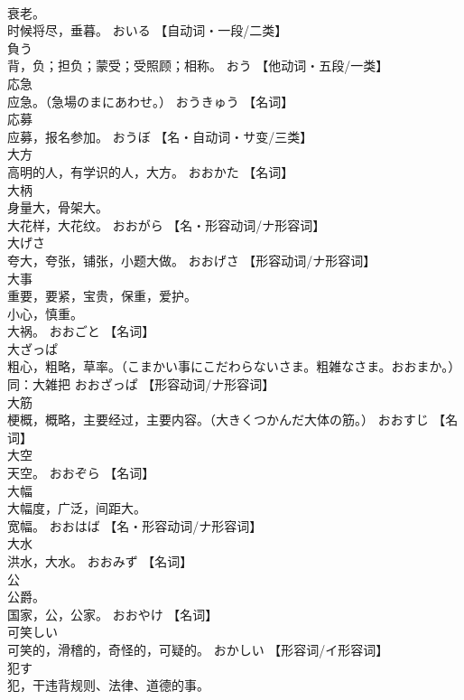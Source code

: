 \documentclass[8pt]{extreport}
\begin{document}
\begin{CJK}{UTF8}{min}
\\	衰老。 
\\	时候将尽，垂暮。	おいる		【自动词・一段/二类】
\\	負う	
\\	背，负；担负；蒙受；受照顾；相称。	おう		【他动词・五段/一类】
\\	応急	
\\	应急。（急場のまにあわせ。）	おうきゅう		【名词】
\\	応募	
\\	应募，报名参加。	おうぼ		【名・自动词・サ变/三类】
\\	大方	
\\	高明的人，有学识的人，大方。	おおかた		【名词】
\\	大柄	
\\	身量大，骨架大。 
\\	大花样，大花纹。	おおがら		【名・形容动词/ナ形容词】
\\	大げさ	
\\	夸大，夸张，铺张，小题大做。	おおげさ		【形容动词/ナ形容词】
\\	大事	
\\	重要，要紧，宝贵，保重，爱护。 
\\	小心，慎重。 
\\	大祸。	おおごと		【名词】
\\	大ざっぱ	
\\	粗心，粗略，草率。（こまかい事にこだわらないさま。粗雑なさま。おおまか。） 
\\	同：大雑把	おおざっぱ		【形容动词/ナ形容词】
\\	大筋	
\\	梗概，概略，主要经过，主要内容。（大きくつかんだ大体の筋。）	おおすじ		【名词】
\\	大空	
\\	天空。	おおぞら		【名词】
\\	大幅	
\\	大幅度，广泛，间距大。 
\\	宽幅。	おおはば		【名・形容动词/ナ形容词】
\\	大水	
\\	洪水，大水。	おおみず		【名词】
\\	公	
\\	公爵。 
\\	国家，公，公家。	おおやけ		【名词】
\\	可笑しい	
\\	可笑的，滑稽的，奇怪的，可疑的。	おかしい		【形容词/イ形容词】
\\	犯す	
\\	犯，干违背规则、法律、道德的事。 

\end{CJK}
\end{document}

